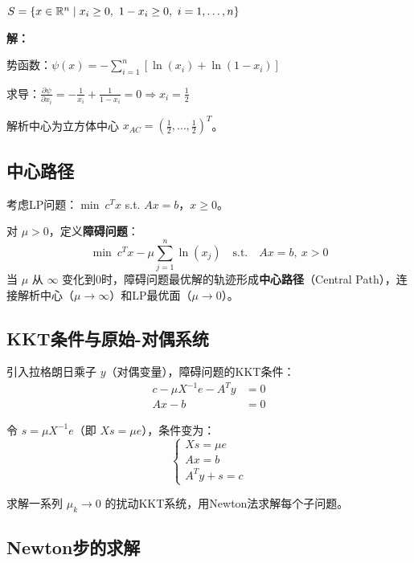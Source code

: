 \begin{example}[单位立方体的解析中心]
$S = \{x \in \mathbb{R}^n \mid x_i \geq 0,\ 1 - x_i \geq 0,\ i = 1, \ldots, n\}$

\textbf{解：}

势函数：$\psi(x) = -\sum_{i=1}^{n}[\ln(x_i) + \ln(1-x_i)]$

求导：$\frac{\partial \psi}{\partial x_i} = -\frac{1}{x_i} + \frac{1}{1-x_i} = 0 \Rightarrow x_i = \frac{1}{2}$

解析中心为立方体中心 $x_{AC} = (\frac{1}{2}, \ldots, \frac{1}{2})^T$。
\end{example}

\subsection{中心路径}

考虑LP问题：$\min\ c^T x$ s.t. $Ax = b$，$x \geq 0$。

\begin{definition}[中心路径]
对 $\mu > 0$，定义\textbf{障碍问题}：
\[
\min\ c^T x - \mu \sum_{j=1}^{n} \ln(x_j)\quad \text{s.t.}\quad Ax = b,\ x > 0
\]
当 $\mu$ 从 $\infty$ 变化到0时，障碍问题最优解的轨迹形成\textbf{中心路径}（Central Path），连接解析中心（$\mu \to \infty$）和LP最优面（$\mu \to 0$）。
\end{definition}

\subsection{KKT条件与原始-对偶系统}

引入拉格朗日乘子 $y$（对偶变量），障碍问题的KKT条件：
\begin{align*}
c - \mu X^{-1}e - A^T y &= 0 \\
Ax - b &= 0
\end{align*}

令 $s = \mu X^{-1}e$（即 $Xs = \mu e$），条件变为：
\[
\begin{cases}
Xs = \mu e \\
Ax = b \\
A^T y + s = c
\end{cases}
\]

\begin{definition}[原始-对偶内点法]
求解一系列 $\mu_k \to 0$ 的扰动KKT系统，用Newton法求解每个子问题。
\end{definition}

\subsection{Newton步的求解}

